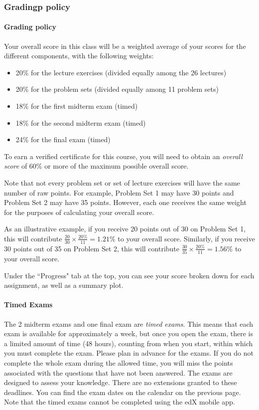 \documentclass[pdftex, brazil, 12pt, twoside]{article}
\begin{document}
\subsubsection{Gradingp policy}
\label{ovw0-sy-grades}

\paragraph{Grading policy} Your overall score in this class will be a weighted
average of your scores for the different components, with the following weights:

\begin{itemize}[noitemsep]
\item 20\% for the lecture exercises (divided equally among the 26 lectures)
\item 20\% for the problem sets (divided equally among 11 problem sets)
\item 18\% for the first midterm exam (timed)
\item 18\% for the second midterm exam (timed)
\item 24\% for the final exam (timed)
\end{itemize}

To earn a verified certificate for this course, you will need to obtain an
\emph{overall score} of 60\% or more of the maximum possible overall score.

Note that not every problem set or set of lecture exercises will have the same
number of raw points. For example, Problem Set 1 may have 30 points and Problem
Set 2 may have 35 points. However, each one receives the same weight for the
purposes of calculating your overall score.

As an illustrative example, if you receive 20 points out of 30 on Problem Set 1,
this will contribute $\frac{20}{30} \times \frac{20\%}{11} = 1.21\%$ to your overall score. Similarly, if
you receive 30 points out of 35 on Problem Set 2, this will contribute
$\frac{30}{35} \times \frac{20\%}{11} = 1.56\%$ to your overall score.

Under the “Progress" tab at the top, you can see your score broken down for each
assignment, as well as a summary plot.

\paragraph{Timed Exams} The 2 midterm exams and one final exam are \emph{timed exams}.
This means that each exam is available for approximately a week, but once you open
the exam, there is a limited amount of time (48 hours), counting from when you start,
within which you must complete the exam. Please plan in advance for the exams. If you
do not complete the whole exam during the allowed time, you will miss the points
associated with the questions that have not been answered. The exams are designed
to assess your knowledge. There are no extensions granted to these deadlines.
You can find the exam dates on the calendar on the previous page. Note that the
timed exams cannot be completed using the edX mobile app.
\end{document}
